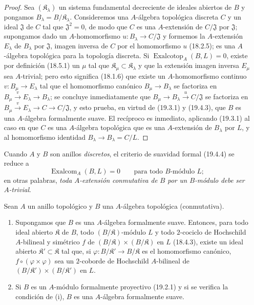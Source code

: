 \begin{proof}
Sea $(\mathfrak K_\lambda)$ un sistema fundamental decreciente de ideales
abiertos de $B$ y pongamos $B_\lambda=B/\mathfrak K_\lambda$.
Consideremos una $A$-álgebra topológica discreta $C$ y un ideal
$\mathfrak J$ de $C$ tal que $\mathfrak J^2=0$, de modo que $C$ es una
$A$-extensión de $C/\mathfrak J$ por $\mathfrak J$; supongamos dado un
$A$-homomorfismo $u:B_\lambda\to C/\mathfrak J$ y formemos la
$A$-extensión $E_\lambda$ de $B_\lambda$ por $\mathfrak J$, imagen
inversa de $C$ por el homomorfismo $u$ (18.2.5); es una $A$-álgebra
topológica para la topología discreta. Si
$\operatorname{Exalcotop}_A(B,L)=0$, existe por definición (18.5.1) un
$\mu$ tal que $\mathfrak K_\mu\subset\mathfrak K_\lambda$ y que
la extensión imagen inversa $E_\mu$ sea $A$-trivial; pero esto significa
(18.1.6) que existe un $A$-homomorfismo continuo
$v:B_\mu\to E_\lambda$ tal que el homomorfismo canónico
$B_\mu\to B_\lambda$ se factoriza en
$B_\mu\xrightarrow{v}E_\lambda\to B_\lambda$; se concluye
inmediatamente que $B_\mu\to B_\lambda\xrightarrow{u}C/\mathfrak J$ se
factoriza en
$B_\mu\xrightarrow{v}E_\lambda\to C\to C/\mathfrak J$, y esto
prueba, en virtud de (19.3.1) y (19.4.3), que $B$ es una $A$-álgebra
formalmente suave. El recíproco es inmediato, aplicando (19.3.1) al caso
en que $C$ es una $A$-álgebra topológica que es una $A$-extensión de
$B_\lambda$ por $L$, y al homomorfismo identidad
$B_\lambda\to B_\lambda=C/L$.
\end{proof}

Cuando $A$ y $B$ son anillos \emph{discretos}, el criterio de suavidad formal
(19.4.4) se reduce a
\begin{equation}
\tag{19.4.4.1}
\label{0.19.4.4.1-fr}
\operatorname{Exalcom}_A(B,L)=0\qquad\text{para todo $B$-módulo $L$};
\end{equation}
en otras palabras, \emph{toda $A$-extensión conmutativa de $B$ por un
$B$-módulo debe ser $A$-trivial}.

\begin{corollary}[19.4.5]
\label{0.19.4.5-fr}
Sean $A$ un anillo topológico y $B$ una $A$-álgebra topológica
(conmutativa).
\begin{enumerate}
  \item[\textup{(i)}] Supongamos que $B$ es una $A$-álgebra formalmente suave.
  Entonces, para todo ideal abierto $\mathfrak K$ de $B$, todo
  $(B/\mathfrak K)$-módulo $L$ y todo $2$-cociclo de Hochschild
  $A$-bilineal y simétrico $f$ de
  $(B/\mathfrak K)\times(B/\mathfrak K)$ en $L$ \textup{(18.4.3)}, existe un
  ideal abierto $\mathfrak K'\subset\mathfrak K$ tal que, si
  $\varphi:B/\mathfrak K'\to B/\mathfrak K$ es el homomorfismo
  canónico, $f\circ(\varphi\times\varphi)$ sea un $2$-coborde de
  Hochschild $A$-bilineal de
  $(B/\mathfrak K')\times(B/\mathfrak K')$ en $L$.
  \item[\textup{(ii)}] Si $B$ es un $A$-módulo formalmente proyectivo \textup{(19.2.1)} y si
  se verifica la condición de \textup{(i)}, $B$ es una $A$-álgebra formalmente
  suave.
\end{enumerate}
\end{corollary}

